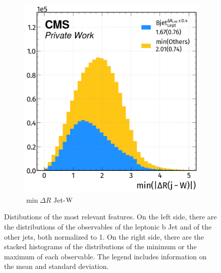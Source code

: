 \begin{figure}[H]
\begin{subfigure}{0.475\linewidth}
        \includegraphics[width=1\linewidth]{fig//chap08-kin_reco/min_dr_W.png}
        \caption{$\min \Delta R$ Jet-${\text{W}}$}
    \end{subfigure}  
    \caption{Distibutions of the most relevant features. On the left side, there are the distributions of the observables of the leptonic b Jet and of the other jets, both normalized to 1.
On the right side, there are the stacked histograms of the distributions of the minimum or the maximum of each observable.
The legend includes information on the mean and standard deviation.}
\end{figure}

